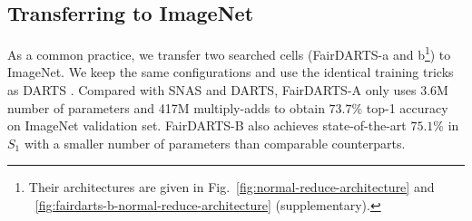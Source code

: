 \documentclass[runningheads]{llncs}
\begin{document}
\subsection{Transferring to ImageNet}
As a common practice, we transfer two searched cells (FairDARTS-a and b\footnote{Their architectures are given in Fig.~\ref{fig:normal-reduce-architecture} and ~\ref{fig:fairdarts-b-normal-reduce-architecture} (supplementary).}) to  ImageNet. We keep the same configurations and use the identical training tricks as DARTS \cite{liu2018darts}. Compared with SNAS \cite{xie2018snas} and DARTS, FairDARTS-A only uses 3.6M number of parameters and 417M multiply-adds to obtain $73.7\%$ top-1 accuracy on ImageNet validation set. FairDARTS-B also achieves state-of-the-art $75.1\%$ in $S_1$ with a smaller number of parameters than comparable counterparts. 
\end{document}

